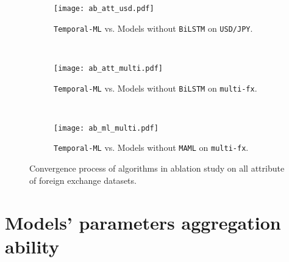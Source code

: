 \begin{sidewaysfigure}[h]
    \centering
    \begin{subfigure}[b]{\textwidth}
        \centering
        \texttt{[image: ab\_att\_usd.pdf]}
        \cprotect\caption{\verb|Temporal-ML| vs. Models without \verb|BiLSTM| on \verb|USD/JPY|.}
        \label{fig:ablation_att_usd}
    \end{subfigure}
    ~
    \begin{subfigure}[b]{\textwidth}
        \centering
        \texttt{[image: ab\_att\_multi.pdf]}
        \cprotect\caption{\verb|Temporal-ML| vs. Models without \verb|BiLSTM| on \verb|multi-fx|.}
        \label{fig:ablation_att_multi}
    \end{subfigure}
    ~
    \begin{subfigure}[b]{\textwidth}
        \centering
        \texttt{[image: ab\_ml\_multi.pdf]}
        \cprotect\caption{\verb|Temporal-ML| vs. Models without \verb|MAML| on \verb|multi-fx|.}
        \label{fig:ablation_ml_multi}
    \end{subfigure}
    \cprotect\caption{Convergence process of algorithms in ablation study on all attribute of foreign exchange datasets.}
    \label{fig:ablation}
\end{sidewaysfigure}

\section{Models' parameters aggregation ability}


